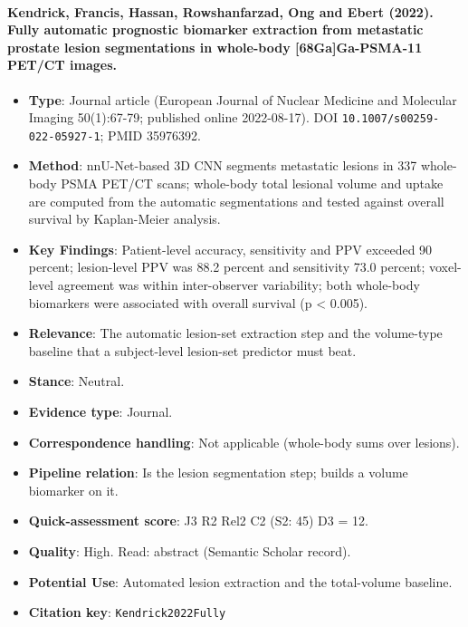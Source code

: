 \documentclass[journal,onecolumn]{IEEEtran}
\begin{document}
\paragraph{Kendrick, Francis, Hassan, Rowshanfarzad, Ong and Ebert (2022). Fully automatic prognostic biomarker extraction from metastatic prostate lesion segmentations in whole-body [68Ga]Ga-PSMA-11 PET/CT images.~\cite{Kendrick2022Fully}}\mbox{}

\begin{itemize}

\item{} \textbf{Type}: Journal article (European Journal of Nuclear Medicine and Molecular Imaging 50(1):67-79; published online 2022-08-17). DOI \nolinkurl{10.1007/s00259-022-05927-1}; PMID 35976392.

\item{} \textbf{Method}: nnU-Net-based 3D CNN segments metastatic lesions in 337 whole-body PSMA PET/CT scans; whole-body total lesional volume and uptake are computed from the automatic segmentations and tested against overall survival by Kaplan-Meier analysis.

\item{} \textbf{Key Findings}: Patient-level accuracy, sensitivity and PPV exceeded 90 percent; lesion-level PPV was 88.2 percent and sensitivity 73.0 percent; voxel-level agreement was within inter-observer variability; both whole-body biomarkers were associated with overall survival (p \textless{} 0.005).

\item{} \textbf{Relevance}: The automatic lesion-set extraction step and the volume-type baseline that a subject-level lesion-set predictor must beat.

\item{} \textbf{Stance}: Neutral.

\item{} \textbf{Evidence type}: Journal.

\item{} \textbf{Correspondence handling}: Not applicable (whole-body sums over lesions).

\item{} \textbf{Pipeline relation}: Is the lesion segmentation step; builds a volume biomarker on it.

\item{} \textbf{Quick-assessment score}: J3 R2 Rel2 C2 (S2: 45) D3 = 12.

\item{} \textbf{Quality}: High. Read: abstract (Semantic Scholar record).

\item{} \textbf{Potential Use}: Automated lesion extraction and the total-volume baseline.

\item{} \textbf{Citation key}: \texttt{Kendrick2022Fully}

\end{itemize}
\end{document}
